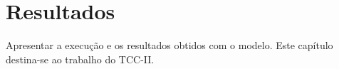 \chapter{Resultados}
Apresentar a execução e os resultados obtidos com o modelo.
Este capítulo destina-se ao trabalho do TCC-II.